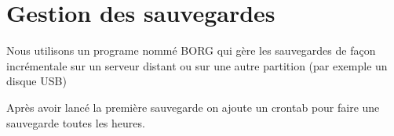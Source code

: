\section{Gestion des sauvegardes}
Nous utilisons un programe nommé BORG qui gère les sauvegardes de façon incrémentale sur un serveur distant ou sur une autre partition (par exemple un disque USB)


Après avoir lancé la première sauvegarde on ajoute un crontab pour faire une sauvegarde toutes les heures.
